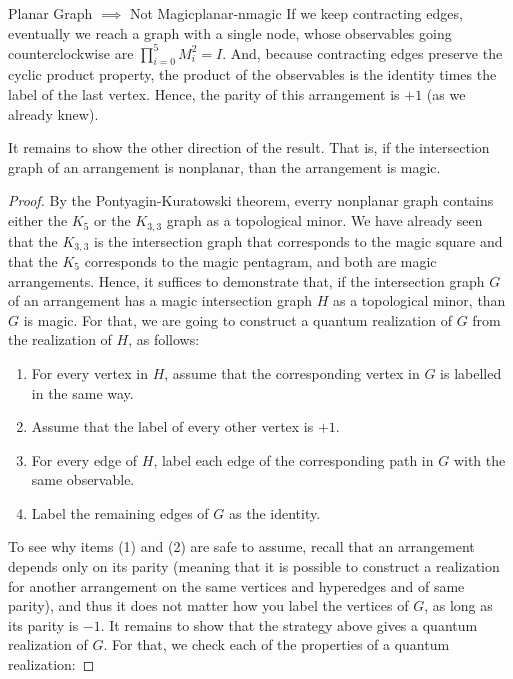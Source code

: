 \documentclass{llncs}
\begin{document}
\begin{tcbexample}{Planar Graph \(\implies\) Not Magic}{planar-nmagic}
  If we keep contracting edges, eventually we reach a graph with a
  single node, whose observables going counterclockwise are
  \(\prod_{i = 0}^{5} M_{i}^{2} = I\). And, because contracting edges
  preserve the cyclic product property, the product of the observables is the
  identity times the label of the last vertex. Hence, the parity of
  this arrangement is \(+1\) (as we already knew).
\end{tcbexample}

It remains to show the other direction of the result. That is, if the
intersection graph of an arrangement is nonplanar, than the
arrangement is magic.

\begin{proof}
  By the Pontyagin-Kuratowski theorem, everry nonplanar graph contains either
  the \(K_{5}\) or the \(K_{3,3}\) graph as a topological minor. We have already seen
  that the \(K_{3, 3}\) is the intersection graph that corresponds to the magic square
  and that the \(K_{5}\) corresponds to the magic pentagram, and both are magic
  arrangements. Hence, it suffices to demonstrate that, if the intersection graph
  \(G\) of an arrangement has a magic intersection graph \(H\) as a topological minor,
  than \(G\) is magic. For that, we are going to construct a quantum realization
  of \(G\) from the realization of \(H\), as follows:

  \begin{enumerate}
  \item For every vertex in \(H\), assume that the corresponding vertex in
    \(G\) is labelled in the same way.
    
  \item Assume that the label of every other vertex is \(+1\).
    
  \item For every edge of \(H\), label each edge of the corresponding  path in \(G\) with
    the same observable.

  \item Label the remaining edges of \(G\) as the identity.
  \end{enumerate}

  To see why items (1) and (2) are safe to assume, recall that an
  arrangement depends only on its parity (meaning that it is possible
  to construct a realization for another arrangement on the same
  vertices and hyperedges and of same parity), and thus it does not
  matter how you label the vertices of \(G\), as long as its parity
  is \(-1\). It remains to show that the strategy above gives a
  quantum realization of \(G\). For that, we check each of the
  properties of a quantum realization:


\end{proof}
\end{document}

